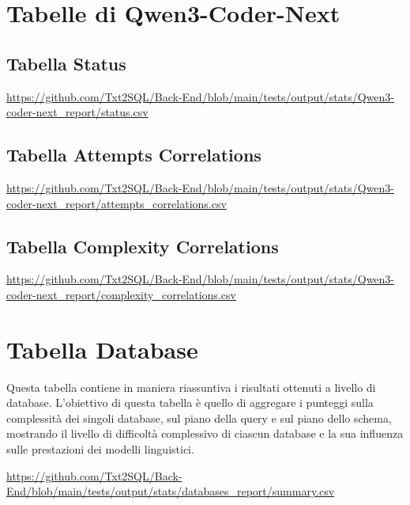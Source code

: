 \section{Tabelle di Qwen3-Coder-Next}

\subsection{Tabella Status}
\label{tab:status_qwen3}
\url{https://github.com/Txt2SQL/Back-End/blob/main/tests/output/stats/Qwen3-coder-next_report/status.csv}

\subsection{Tabella Attempts Correlations}
\label{tab:attempts_qwen3}
\url{https://github.com/Txt2SQL/Back-End/blob/main/tests/output/stats/Qwen3-coder-next_report/attempts_correlations.csv}

\subsection{Tabella Complexity Correlations}
\label{tab:complexity_qwen3}
\url{https://github.com/Txt2SQL/Back-End/blob/main/tests/output/stats/Qwen3-coder-next_report/complexity_correlations.csv}


\section{Tabella Database}
\label{sec:tabella_database_summary}

Questa tabella contiene in maniera riassuntiva i risultati ottenuti a livello di database. L'obiettivo di questa tabella è quello di aggregare i punteggi sulla complessità dei singoli database, sul piano della query e sul piano dello schema, mostrando il livello di difficoltà complessivo di ciascun database e la sua influenza sulle prestazioni dei modelli linguistici.

\url{https://github.com/Txt2SQL/Back-End/blob/main/tests/output/stats/databases_report/summary.csv}